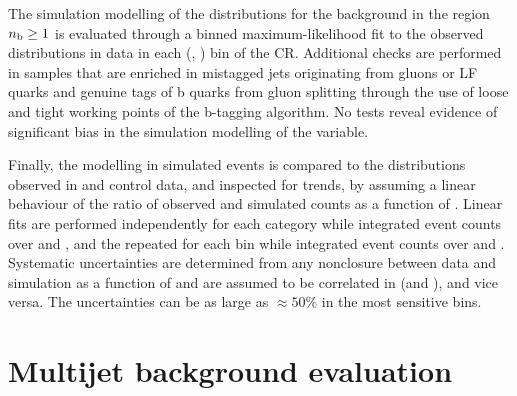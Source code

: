 The simulation modelling of the \nb distributions for the \znunuj
background in the region $n_{\text{b}} \geq 1$ is evaluated through a binned
maximum-likelihood fit to the observed \nb distributions in data in
each (\njet, \scalht) bin of the \mmj CR. Additional checks are
performed in \mmj samples that are enriched in mistagged jets
originating from gluons or LF quarks and genuine tags of b quarks from
gluon splitting through the use of loose and tight working points of
the b-tagging algorithm. No tests reveal evidence of significant bias
in the simulation modelling of the \nb variable.

Finally, the \mht modelling in simulated events is compared to the
distributions observed in \mj and \mmj control data, and inspected for
trends, by assuming a linear behaviour of the ratio of observed and
simulated counts as a function of \mht. Linear fits are performed
independently for each \njet category while integrated event counts
over \nb and \scalht, and the repeated for each \scalht bin while
integrated event counts over \njet and \nb. 
Systematic uncertainties are determined from any nonclosure between
data and simulation as a function of \njet and are assumed to be
correlated in \scalht (and \nb), and vice versa. The uncertainties can
be as large as ${\approx}50\%$ in the most sensitive \mht bins.


\section{Multijet background evaluation}
\label{sec:qcd}

